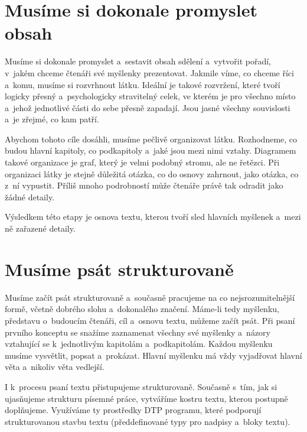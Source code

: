 \section{Musíme si dokonale promyslet obsah}
Musíme si dokonale promyslet a~sestavit obsah sdělení a~vytvořit pořadí, v~jakém chceme čtenáři své myšlenky prezentovat. 
Jakmile víme, co chceme říci a~komu, musíme si rozvrhnout látku. Ideální je takové rozvržení, které tvoří logicky přesný a~psychologicky stravitelný celek, ve kterém je pro všechno místo a~jehož jednotlivé části do sebe přesně zapadají. Jsou jasné všechny souvislosti a~je zřejmé, co kam patří.

Abychom tohoto cíle dosáhli, musíme pečlivě organizovat látku. Rozhodneme, co budou hlavní kapitoly, co podkapitoly a~jaké jsou mezi nimi vztahy. Diagramem takové organizace je graf, který je velmi podobný stromu, ale ne řetězci. Při organizaci látky je stejně důležitá otázka, co do osnovy zahrnout, jako otázka, co z~ní vypustit. Příliš mnoho podrobností může čtenáře právě tak odradit jako žádné detaily.

Výsledkem této etapy je osnova textu, kterou tvoří sled hlavních myšlenek a~mezi ně zařazené detaily.

\section{Musíme psát strukturovaně} 
Musíme začít psát strukturovaně a~současně pracujeme na co nejsrozumitelnější formě, včetně dobrého slohu a~dokonalého značení. 
Máme-li tedy myšlenku, představu o~budoucím čtenáři, cíl a~osnovu textu, můžeme začít psát. Při psaní prvního konceptu se snažíme zaznamenat všechny své myšlenky a~názory vztahující se k~jednotlivým kapitolám a~podkapitolám. Každou myšlenku musíme vysvětlit, popsat a~prokázat. Hlavní myšlenku má vždy vyjadřovat hlavní věta a~nikoliv věta vedlejší.

I k~procesu psaní textu přistupujeme strukturovaně. Současně s~tím, jak si ujasňujeme strukturu písemné práce, vytváříme kostru textu, kterou postupně doplňujeme. Využíváme ty prostředky DTP programu, které podporují strukturovanou stavbu textu (předdefinované typy pro nadpisy a~bloky textu). 


